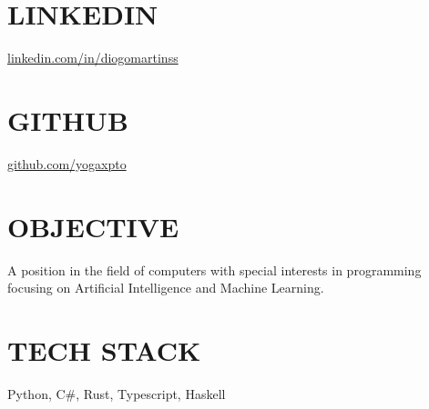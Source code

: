 \documentclass[margin, 10pt]{res} %
\begin{document}
\begin{resume}


    \section{LINKEDIN}

    \href{https://www.linkedin.com/in/diogomartinss}{linkedin.com/in/diogomartinss}


    \section{GITHUB}

    \href{https://github.com/yogaxpto}{github.com/yogaxpto}


    \section{OBJECTIVE}

    A position in the field of computers with special interests in programming focusing on Artificial Intelligence and Machine Learning.



    \section{TECH STACK}

    Python, C\#, Rust, Typescript, Haskell



\end{resume}
\end{document}
